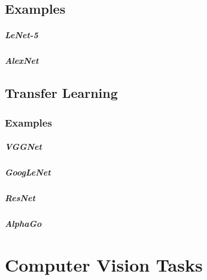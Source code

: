	\section{Examples} %

		\paragraph{LeNet-5} %

		\paragraph{AlexNet} %

	\section{Transfer Learning} %

		\subsection{Examples} %

			\paragraph{VGGNet} %

			\paragraph{GoogLeNet} %

			\paragraph{ResNet} %

			\paragraph{AlphaGo} %

\chapter{Computer Vision Tasks} %

